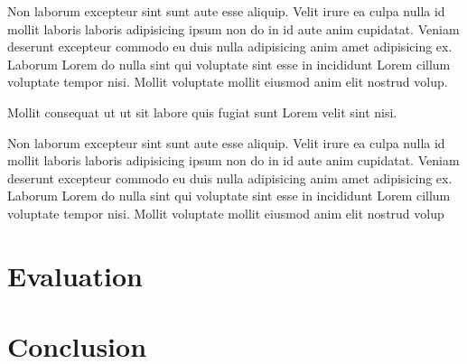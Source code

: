 \documentclass[10pt]{article}
\begin{document}
Non laborum excepteur sint sunt aute esse aliquip. Velit irure ea culpa nulla id mollit laboris laboris adipisicing ipsum non do in id aute anim cupidatat. Veniam deserunt excepteur commodo eu duis nulla adipisicing anim amet adipisicing ex. Laborum Lorem do nulla sint qui voluptate sint esse in incididunt Lorem cillum voluptate tempor nisi. Mollit voluptate mollit eiusmod anim elit nostrud volup.

% 

Mollit consequat ut ut sit labore quis fugiat sunt Lorem velit sint nisi.

% 

Non laborum excepteur sint sunt aute esse aliquip. Velit irure ea culpa nulla id mollit laboris laboris adipisicing ipsum non do in id aute anim cupidatat. Veniam deserunt excepteur commodo eu duis nulla adipisicing anim amet adipisicing ex. Laborum Lorem do nulla sint qui voluptate sint esse in incididunt Lorem cillum voluptate tempor nisi. Mollit voluptate mollit eiusmod anim elit nostrud volup

\section{Evaluation}

\section{Conclusion}



\end{document}

